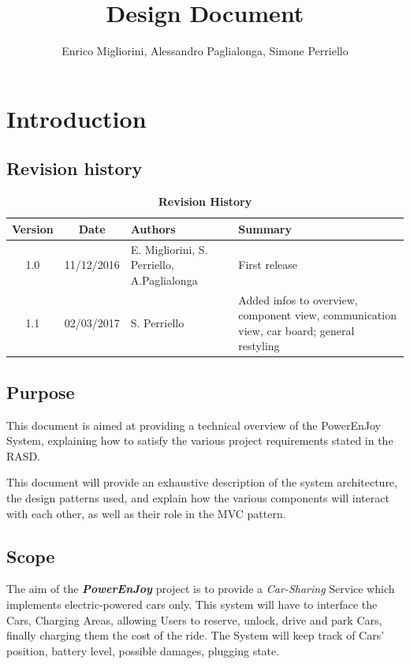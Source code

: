 \documentclass[12pt]{article}
\title{Design Document}
\author{Enrico Migliorini, Alessandro Paglialonga, Simone Perriello}
\begin{document}
\maketitle
\clearpage
\tableofcontents
\clearpage

\section{Introduction}
\subsection{Revision history}
\begin{longtable}{| c | c | p{40mm}  | p{50mm} |}
	\caption{\textbf{Revision History}}
	\label{tab:rev_history}
	\\ \hline
	
	\textbf{Version} & \textbf{Date} & \textbf{Authors} & \textbf{Summary}\\ \hline
	1.0 & 11/12/2016& E. Migliorini, S. Perriello, A.Paglialonga & First release\\ \hline
	1.1 & 02/03/2017& S. Perriello & Added infos to overview, component view, communication view, car board; general restyling\\ \hline
	
\end{longtable}
\subsection{Purpose}
This document is aimed at providing a technical overview of the PowerEnJoy System, explaining how to satisfy the various project requirements stated in the RASD.

This document will provide an exhaustive description of the system architecture, the design patterns used, and explain how the various components will interact with each other, as well as their role in the MVC pattern.
\subsection{Scope}
The aim of the \textbf{\emph{PowerEnJoy}} project is to provide a \textit{Car-Sharing} Service which implements electric-powered cars only.
This system will have to interface the Cars, Charging Areas, allowing Users to reserve, unlock, drive and park Cars, finally charging them the cost of the ride. 
The System will keep track of Cars' position, battery level, possible damages, plugging state.
\end{document}
